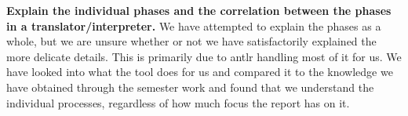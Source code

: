 



\textbf{Explain the individual phases and the correlation between the phases in a translator/interpreter.} We have attempted to explain the phases as a whole, but we are unsure whether or not we have satisfactorily explained the more delicate details. This is primarily due to \gls{antlr} handling most of it for us. We have looked into what the tool does for us and compared it to the knowledge we have obtained through the semester work and found that we understand the individual processes, regardless of how much focus the report has on it.



